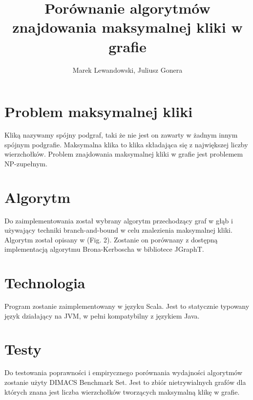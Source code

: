 \documentclass[12pt, a4paper]{article}
\author{Marek Lewandowski, Juliusz Gonera}
\date{}
\title{Porównanie algorytmów znajdowania maksymalnej kliki w grafie}
\begin{document}
\maketitle

\section{Problem maksymalnej kliki}
\label{sec-1}
Kliką nazywamy spójny podgraf, taki że nie jest on zawarty w żadnym innym spójnym podgrafie. Maksymalna klika to klika składająca się z największej liczby wierzchołków. Problem znajdowania maksymalnej kliki w grafie jest problemem NP-zupełnym.

\section{Algorytm}
\label{sec-2}
Do zaimplementowania został wybrany algorytm przechodzący graf w głąb i używający techniki branch-and-bound w celu znalezienia maksymalnej kliki. Algorytm został opisany w \citep{bioinf} (Fig. 2). Zostanie on porównany z dostępną implementacją algorytmu Brona-Kerboscha w bibliotece JGraphT\citep{jgrapht}.

\section{Technologia}
\label{sec-3}
Program zostanie zaimplementowany w języku Scala. Jest to statycznie typowany język działający na JVM, w pełni kompatybilny z językiem Java.

\section{Testy}
\label{sec-4}
Do testowania poprawności i empirycznego porównania wydajności algorytmów zostanie użyty DIMACS Benchmark Set\citep{dimacs}. Jest to zbiór nietrywialnych grafów dla których znana jest liczba wierzchołków tworzących maksymalną klikę w grafie.

\nocite{*}


\end{document}
